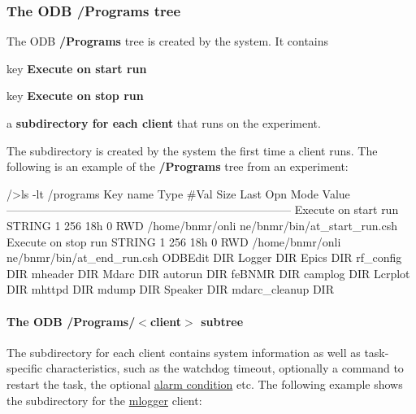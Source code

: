 \label{RC_customize_ODB_idx_ODB_tree_Programs}
\hypertarget{RC_customize_ODB_idx_ODB_tree_Programs}{}
\hypertarget{RC_customize_ODB_RC_ODB_Programs_Tree}{}\subsubsection{The ODB /Programs tree}\label{RC_customize_ODB_RC_ODB_Programs_Tree}
The ODB {\bfseries /Programs} tree is created by the system. It contains


\begin{DoxyItemize}
\item key {\bfseries Execute on start run}
\item key {\bfseries Execute on stop run}
\item a {\bfseries subdirectory for each client} that runs on the experiment.
\end{DoxyItemize}

The subdirectory is created by the system the first time a client runs. The following is an example of the {\bfseries /Programs} tree from an experiment:


\begin{DoxyCode}
/>ls -lt /programs
Key name                        Type    #Val  Size  Last Opn Mode Value
---------------------------------------------------------------------------
Execute on start run            STRING  1     256   18h  0   RWD  /home/bnmr/onli
      ne/bnmr/bin/at_start_run.csh
Execute on stop run             STRING  1     256   18h  0   RWD  /home/bnmr/onli
      ne/bnmr/bin/at_end_run.csh
ODBEdit                         DIR
Logger                          DIR
Epics                           DIR
rf_config                       DIR
mheader                         DIR
Mdarc                           DIR
autorun                         DIR
feBNMR                          DIR
camplog                         DIR
Lcrplot                         DIR
mhttpd                          DIR
mdump                           DIR
Speaker                         DIR
mdarc_cleanup                   DIR
\end{DoxyCode}
\hypertarget{RC_customize_ODB_RC_ODB_programs_client}{}\paragraph{The ODB /Programs/$<$client$>$ subtree}\label{RC_customize_ODB_RC_ODB_programs_client}
The subdirectory for each client contains system information as well as task-\/specific characteristics, such as the watchdog timeout, optionally a command to restart the task, the optional \hyperlink{RC_customize_ODB_RC_Alarm_System}{alarm condition} etc. The following example shows the subdirectory for the \hyperlink{F_Logging_F_mlogger_utility}{mlogger} client:


